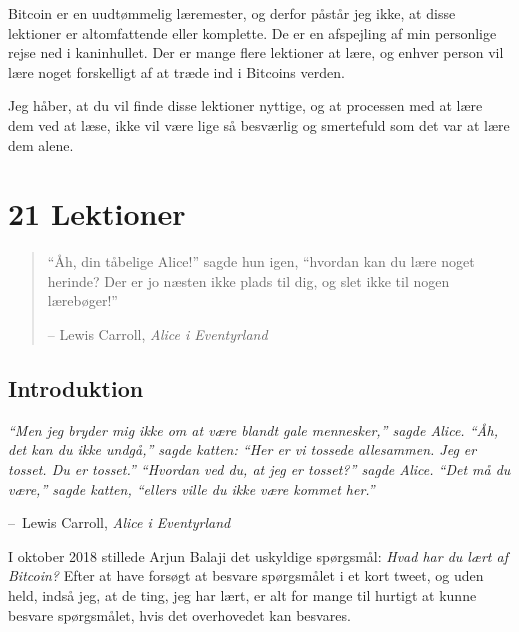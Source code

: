 \documentclass[paper=6in:9in,pagesize=pdftex,headinclude=on,footinclude=on,12pt]{scrbook}
\makeatletter
\newenvironment{chapquote}[2][4em]{\setlength{\@tempdima}{#1}%
   \def\chapquote@author{#2}%
   \parshape 1 \@tempdima \dimexpr\textwidth-2\@tempdima\relax%
   \itshape}{\par\normalfont\hfill--\ \chapquote@author\hspace*{\@tempdima}\par\bigskip}
\makeatother
\begin{document}
Bitcoin er en uudtømmelig læremester, og derfor påstår jeg ikke, at disse lektioner er altomfattende eller komplette. De er en afspejling af min personlige rejse ned i kaninhullet. Der er mange flere lektioner at lære, og enhver person vil lære noget forskelligt af at træde ind i Bitcoins verden.

Jeg håber, at du vil finde disse lektioner nyttige, og at processen med at lære dem ved at læse, ikke vil være lige så besværlig og smertefuld som det var at lære dem alene.%

\mainmatter

\part*{21 Lektioner}

\newpage \vspace*{8cm}
\thispagestyle{fancy}
\begin{quotation}
\begin{center}
  \large \enquote{Åh, din tåbelige Alice!} sagde hun igen, \enquote{hvordan kan du lære noget herinde? Der er jo næsten ikke plads til dig, og slet ikke til nogen lærebøger!} \end{center}
\begin{flushright} -- Lewis Carroll, \textit{Alice i Eventyrland}\end{flushright}
\end{quotation}

\chapter*{Introduktion}
\label{ch:introduction}

\begin{chapquote}{Lewis Carroll, \textit{Alice i Eventyrland}} \enquote{Men jeg bryder mig ikke om at være blandt gale mennesker,} sagde Alice. \enquote{Åh, det kan du ikke undgå,} sagde katten: \enquote{Her er vi tossede allesammen. Jeg er tosset. Du er tosset.} \enquote{Hvordan ved du, at jeg er tosset?} sagde Alice. \enquote{Det må du være,} sagde katten, \enquote{ellers ville du ikke være kommet her.} \end{chapquote}

I oktober 2018 stillede Arjun Balaji det uskyldige spørgsmål: \textit{Hvad har du lært af Bitcoin?} Efter at have forsøgt at besvare spørgsmålet i et kort tweet, og uden held, indså jeg, at de ting, jeg har lært, er alt for mange til hurtigt at kunne besvare spørgsmålet, hvis det overhovedet kan besvares.
\end{document}
